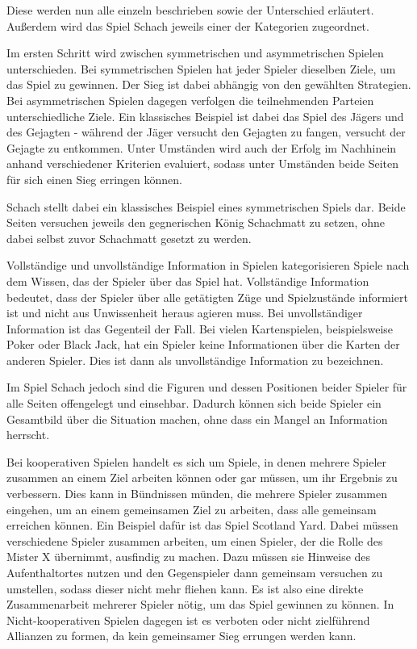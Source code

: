 Diese werden nun alle einzeln beschrieben sowie der Unterschied erläutert. Außerdem wird das Spiel Schach jeweils einer der Kategorien zugeordnet.

Im ersten Schritt wird zwischen symmetrischen und asymmetrischen Spielen unterschieden. Bei symmetrischen Spielen hat jeder Spieler dieselben Ziele, um das Spiel zu gewinnen. Der Sieg ist dabei abhängig von den gewählten Strategien. Bei asymmetrischen Spielen dagegen verfolgen die teilnehmenden Parteien unterschiedliche Ziele\cite{Rodriguez}. Ein klassisches Beispiel ist dabei das Spiel des Jägers und des Gejagten - während der Jäger versucht den Gejagten zu fangen, versucht der Gejagte zu entkommen. Unter Umständen wird auch der Erfolg im Nachhinein anhand verschiedener Kriterien evaluiert, sodass unter Umständen beide Seiten für sich einen Sieg erringen können.

Schach stellt dabei ein klassisches Beispiel eines symmetrischen Spiels dar. Beide Seiten versuchen jeweils den gegnerischen König Schachmatt zu setzen, ohne dabei selbst zuvor Schachmatt gesetzt zu werden.

Vollständige und unvollständige Information in Spielen kategorisieren Spiele nach dem Wissen, das der Spieler über das Spiel hat. Vollständige Information bedeutet, dass der Spieler über alle getätigten Züge und Spielzustände informiert ist und nicht aus Unwissenheit heraus agieren muss. Bei unvollständiger Information ist das Gegenteil der Fall\cite{Rodriguez}. Bei vielen Kartenspielen, beispielsweise Poker oder Black Jack, hat ein Spieler keine Informationen über die Karten der anderen Spieler. Dies ist dann als unvollständige Information zu bezeichnen.

Im Spiel Schach jedoch sind die Figuren und dessen Positionen beider Spieler für alle Seiten offengelegt und einsehbar. Dadurch können sich beide Spieler ein Gesamtbild über die Situation machen, ohne dass ein Mangel an Information herrscht.

Bei kooperativen Spielen handelt es sich um Spiele, in denen mehrere Spieler zusammen an einem Ziel arbeiten können oder gar müssen, um ihr Ergebnis zu verbessern. Dies kann in Bündnissen münden, die mehrere Spieler zusammen eingehen, um an einem gemeinsamen Ziel zu arbeiten, dass alle gemeinsam erreichen können. \cite{Rodriguez} Ein Beispiel dafür ist das Spiel Scotland Yard. Dabei müssen verschiedene Spieler zusammen arbeiten, um einen Spieler, der die Rolle des Mister X übernimmt, ausfindig zu machen. Dazu müssen sie Hinweise des Aufenthaltortes nutzen und den Gegenspieler dann gemeinsam versuchen zu umstellen, sodass dieser nicht mehr fliehen kann. Es ist also eine direkte Zusammenarbeit mehrerer Spieler nötig, um das Spiel gewinnen zu können. \cite{Ravensburg2000} In Nicht-kooperativen Spielen dagegen ist es verboten oder nicht zielführend Allianzen zu formen, da kein gemeinsamer Sieg errungen werden kann. \cite{Rodriguez}


